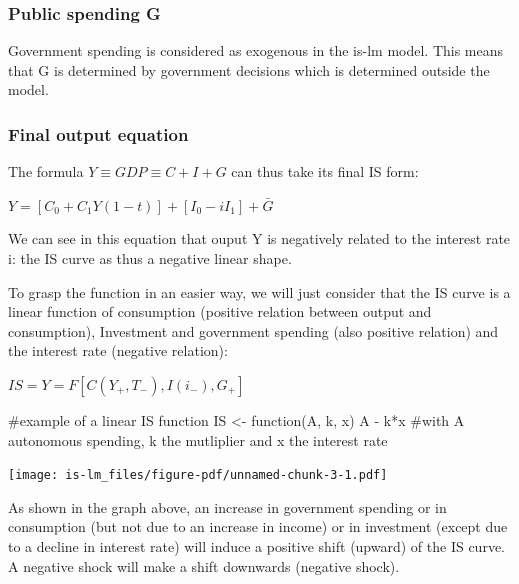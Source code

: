 \documentclass[
  letterpaper,
  DIV=11,
  numbers=noendperiod]{scrreprt}
\newenvironment{Shaded}{\begin{snugshade}}{\end{snugshade}}
\newcommand{\CommentTok}[1]{\textcolor[rgb]{0.37,0.37,0.37}{#1}}
\newcommand{\ControlFlowTok}[1]{\textcolor[rgb]{0.00,0.23,0.31}{#1}}
\newcommand{\NormalTok}[1]{\textcolor[rgb]{0.00,0.23,0.31}{#1}}
\newcommand{\OtherTok}[1]{\textcolor[rgb]{0.00,0.23,0.31}{#1}}
\newcommand{\SpecialCharTok}[1]{\textcolor[rgb]{0.37,0.37,0.37}{#1}}
\begin{document}
\hypertarget{public-spending-g}{%
\subsubsection{Public spending G}\label{public-spending-g}}

Government spending is considered as exogenous in the is-lm model. This
means that G is determined by government decisions which is determined
outside the model.

\hypertarget{final-output-equation}{%
\subsubsection{Final output equation}\label{final-output-equation}}

The formula \(Y \equiv GDP \equiv C + I + G\) can thus take its final IS
form:

\(Y = [C_{0} + C_{1}Y(1-t)] + [I_{0} - iI_{1}] + \bar{G}\)

We can see in this equation that ouput Y is negatively related to the
interest rate i: the IS curve as thus a negative linear shape.

To grasp the function in an easier way, we will just consider that the
IS curve is a linear function of consumption (positive relation between
output and consumption), Investment and government spending (also
positive relation) and the interest rate (negative relation):

\(IS = Y = F[C(Y_{+}, T_{-}), I(i_{-}), G_{+}]\)

\begin{Shaded}
\begin{Highlighting}[]
\CommentTok{\#example of a linear IS function}
\NormalTok{IS }\OtherTok{\textless{}{-}} \ControlFlowTok{function}\NormalTok{(A, k, x) A }\SpecialCharTok{{-}}\NormalTok{ k}\SpecialCharTok{*}\NormalTok{x }\CommentTok{\#with A autonomous spending, k the mutliplier and x the interest rate}
\end{Highlighting}
\end{Shaded}

\texttt{[image: is-lm\_files/figure-pdf/unnamed-chunk-3-1.pdf]}

As shown in the graph above, an increase in government spending or in
consumption (but not due to an increase in income) or in investment
(except due to a decline in interest rate) will induce a positive shift
(upward) of the IS curve. A negative shock will make a shift downwards
(negative shock).
\end{document}
